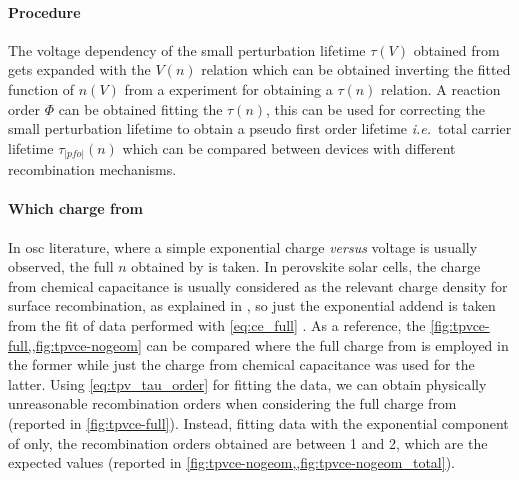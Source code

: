 		\paragraph{Procedure}
		The voltage dependency of the small perturbation lifetime $\tau(V)$ obtained from  gets expanded with the $V(n)$ relation which can be obtained inverting the fitted function of $n(V)$ from a  experiment for obtaining a $\tau(n)$ relation.
		A reaction order $\Phi$ can be obtained fitting the $\tau(n)$, this can be used for correcting the small perturbation lifetime to obtain a pseudo first order lifetime \textsl{i.e.}\ total carrier lifetime $\tau_|pfo|(n)$ which can be compared between devices with different recombination mechanisms.

		\paragraph{Which charge from }
		In \gls{osc} literature, where a simple exponential charge \textsl{versus} voltage is usually observed, the full $n$ obtained by  is taken.
		In perovskite solar cells, the charge from chemical capacitance is usually considered as the relevant charge density for surface recombination, as explained in , so just the exponential addend is taken from the fit of  data performed with \cref{eq:ce_full} \cite{Du2018,Gelmetti2019,Wheeler2017}.
		As a reference, the \cref{fig:tpvce-full,,fig:tpvce-nogeom} can be compared where the full charge from  is employed in the former while just the charge from chemical capacitance was used for the latter.
		Using \cref{eq:tpv_tau_order} for fitting the data, we can obtain physically unreasonable recombination orders when considering the full charge from  (reported in \cref{fig:tpvce-full}).
		Instead, fitting data with the exponential component of  only, the recombination orders obtained are between 1 and 2, which are the expected values (reported in \cref{fig:tpvce-nogeom,,fig:tpvce-nogeom_total}).

